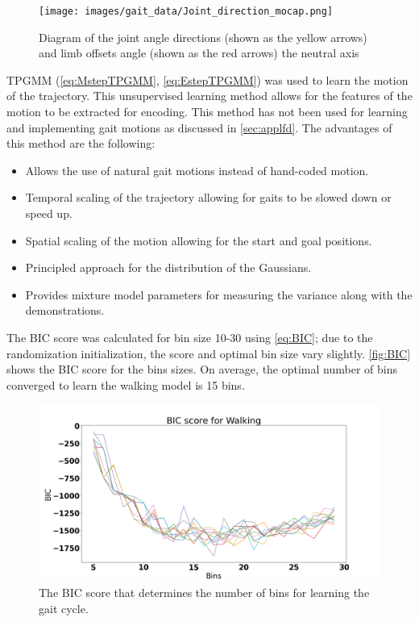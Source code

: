 \begin{figure}[h]
    \centering
    \texttt{[image: images/gait\_data/Joint\_direction\_mocap.png]}
    \caption[Gait Training Demos]{Diagram of the joint angle directions (shown as the yellow arrows) and limb offsets angle (shown as the red arrows) the neutral axis}
    \label{fig:TrainingJointPosition}
\end{figure}

TPGMM (\autoref{eq:MstepTPGMM}, \autoref{eq:EstepTPGMM}) was used to learn the motion of the trajectory. This unsupervised learning method allows for the features of the motion to be extracted for encoding. This method has not been used for learning and implementing gait motions as discussed in \autoref{sec:applfd}. The advantages of this method are the following:

\begin{itemize}
    \item Allows the use of natural gait motions instead of hand-coded motion.
    \item Temporal scaling of the trajectory allowing for gaits to be slowed down or speed up.
    \item Spatial scaling of the motion allowing for the start and goal positions.
    \item Principled approach for the distribution of the Gaussians.
    \item Provides mixture model parameters for measuring the variance along with the demonstrations.
\end{itemize}


The BIC score was calculated for bin size 10-30 using  \autoref{eq:BIC}; due to the randomization initialization, the score and optimal bin size vary slightly. \autoref{fig:BIC} shows the BIC score for the bins sizes. On average, the optimal number of bins converged to learn the walking model is 15 bins.    

\begin{figure}
    \centering
    \includegraphics[scale=0.3]{images/gait_data/BIC_Walk.png}
    \caption[BIC Score for Walking]{The BIC score that determines the number of bins for learning the gait cycle.}
    \label{fig:BIC}
\end{figure}

